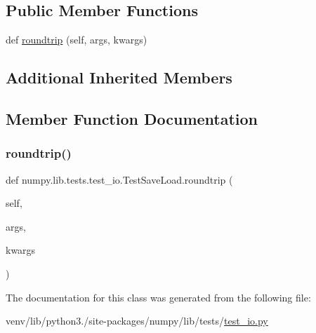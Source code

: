 \subsection*{Public Member Functions}
\begin{DoxyCompactItemize}
\item 
def \hyperlink{classnumpy_1_1lib_1_1tests_1_1test__io_1_1TestSaveLoad_ad8660de21a23a0e50cb2ead9011f5bef}{roundtrip} (self, args, kwargs)
\end{DoxyCompactItemize}
\subsection*{Additional Inherited Members}


\subsection{Member Function Documentation}
\mbox{\label{classnumpy_1_1lib_1_1tests_1_1test__io_1_1TestSaveLoad_ad8660de21a23a0e50cb2ead9011f5bef}} 
\subsubsection{\texorpdfstring{roundtrip()}{roundtrip()}}
{\footnotesize\ttfamily def numpy.\+lib.\+tests.\+test\+\_\+io.\+Test\+Save\+Load.\+roundtrip (\begin{DoxyParamCaption}\item[{}]{self,  }\item[{}]{args,  }\item[{}]{kwargs }\end{DoxyParamCaption})}



The documentation for this class was generated from the following file\+:\begin{DoxyCompactItemize}
\item 
venv/lib/python3./site-\/packages/numpy/lib/tests/\hyperlink{test__io_8py}{test\+\_\+io.\+py}\end{DoxyCompactItemize}
